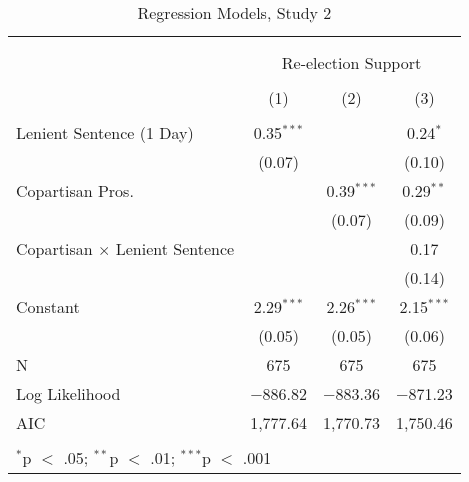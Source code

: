 \documentclass[12pt,letterpaper]{article}
\begin{document}
\begin{table}[!htbp] \centering   \caption{Regression Models, Study 2}   \label{} \begin{tabular}{@{\extracolsep{5pt}}lccc} \\[-1.8ex]\hline \\[-1.8ex] \\[-1.8ex] & \multicolumn{3}{c}{Re-election Support} \\ \\[-1.8ex] & (1) & (2) & (3)\\ \hline \\[-1.8ex]  Lenient Sentence (1 Day) & 0.35$^{***}$ &  & 0.24$^{*}$ \\   & (0.07) &  & (0.10) \\   Copartisan Pros. &  & 0.39$^{***}$ & 0.29$^{**}$ \\   &  & (0.07) & (0.09) \\   Copartisan $\times$ Lenient Sentence &  &  & 0.17 \\   &  &  & (0.14) \\   Constant & 2.29$^{***}$ & 2.26$^{***}$ & 2.15$^{***}$ \\   & (0.05) & (0.05) & (0.06) \\  N & 675 & 675 & 675 \\ Log Likelihood & $-$886.82 & $-$883.36 & $-$871.23 \\ AIC & 1,777.64 & 1,770.73 & 1,750.46 \\ \hline \\[-1.8ex] \multicolumn{4}{l}{$^{*}$p $<$ .05; $^{**}$p $<$ .01; $^{***}$p $<$ .001} \\ \end{tabular} \end{table} 
\end{document}
